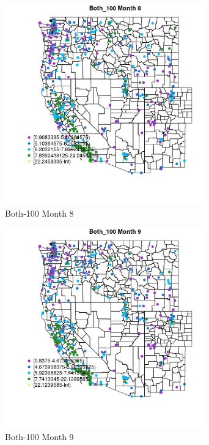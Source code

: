 \begin{figure} 
\centering  
\includegraphics[width=0.77\textwidth]{Code_Outputs/ML_input_report_ML_input_PM25_Step5_part_d_de_duplicated_aves_ML_input_MapObsMo8Both_100.jpg} 
\caption{\label{fig:ML_input_report_ML_input_PM25_Step5_part_d_de_duplicated_aves_ML_inputMapObsMo8Both_100}Both-100 Month 8} 
\end{figure} 
 

\begin{figure} 
\centering  
\includegraphics[width=0.77\textwidth]{Code_Outputs/ML_input_report_ML_input_PM25_Step5_part_d_de_duplicated_aves_ML_input_MapObsMo9Both_100.jpg} 
\caption{\label{fig:ML_input_report_ML_input_PM25_Step5_part_d_de_duplicated_aves_ML_inputMapObsMo9Both_100}Both-100 Month 9} 
\end{figure} 
 

